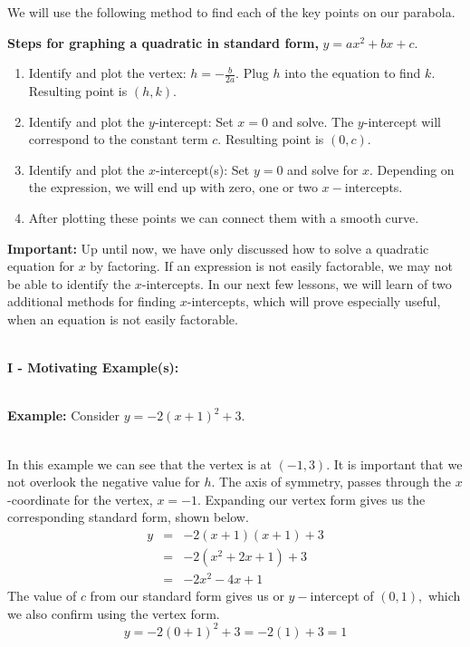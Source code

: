 \documentclass[12pt]{article}
\theoremstyle{definition}
\begin{document}
We will use the following method to find each of the key points on our parabola.

\begin{center}
  {\bf Steps for graphing a quadratic in standard form,} $y = a x^2 + b x + c$.
\end{center}
\begin{enumerate}
  \item Identify and plot the vertex: $h = -\displaystyle\frac{b}{2 a}$. Plug $h$ into the equation to find $k$.  Resulting point is $(h,k)$.
	
	\item Identify and plot the $y$-intercept: Set $x = 0$ and solve.  The $y$-intercept will correspond to the constant term $c$.  Resulting point is $(0,c)$.
  
  \item Identify and plot the $x$-intercept(s): Set $y = 0$ and solve for $x$.  Depending on the expression, we will end up with zero, one or two $x-$intercepts.
	\item After plotting these points we can connect them with a smooth curve.\\
\end{enumerate}

{\bf Important:} Up until now, we have only discussed how to solve a quadratic equation for $x$ by factoring.  If an expression is not easily factorable, we may not be able to identify the $x$-intercepts.  In our next few lessons, we will learn of two additional methods for finding $x$-intercepts, which will prove especially useful, when an equation is not easily factorable.\\
\ \par
{\bf I - Motivating Example(s):}\\
\ \par
{\bf Example:} Consider $y=-2(x+1)^2+3$.\\
\ \par
In this example we can see that the vertex is at $(-1,3)$. It is important that we not overlook the negative value for $h$.  The axis of symmetry, passes through the $x$-coordinate for the vertex, $x=-1$.  Expanding our vertex form gives us the corresponding standard form, shown below.
\begin{eqnarray*}
	y & = & -2(x+1)(x+1)+3\\
		& = & -2(x^2+2x+1)+3\\
		& = & -2x^2-4x+1
\end{eqnarray*}
The value of $c$ from our standard form gives us or $y-$intercept of $(0,1),$ which we also confirm using the vertex form.
$$y = -2(0+1)^2+3=-2(1)+3=1$$
\end{document}
